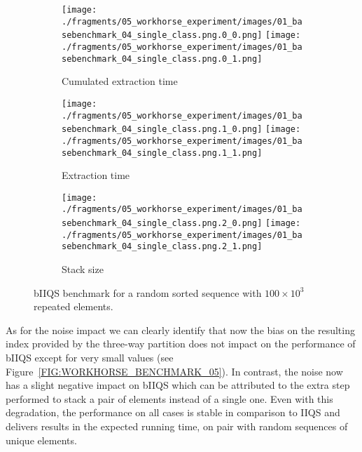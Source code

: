 \begin{figure}
    \centering
    \begin{subfigure}[b]{\textwidth}
        \centering
        \texttt{[image: ./fragments/05\_workhorse\_experiment/images/01\_basebenchmark\_04\_single\_class.png.0\_0.png]}
        \texttt{[image: ./fragments/05\_workhorse\_experiment/images/01\_basebenchmark\_04\_single\_class.png.0\_1.png]}
        \caption{Cumulated extraction time}
        \label{FIG:WORKHORSE_BENCHMARK_04__0_0}
    \end{subfigure}

    \begin{subfigure}[b]{\textwidth}
        \centering
        \texttt{[image: ./fragments/05\_workhorse\_experiment/images/01\_basebenchmark\_04\_single\_class.png.1\_0.png]}
        \texttt{[image: ./fragments/05\_workhorse\_experiment/images/01\_basebenchmark\_04\_single\_class.png.1\_1.png]}
        \caption{Extraction time}
        \label{FIG:WORKHORSE_BENCHMARK_04__0_1}
    \end{subfigure}

    \begin{subfigure}[b]{\textwidth}
        \centering
        \texttt{[image: ./fragments/05\_workhorse\_experiment/images/01\_basebenchmark\_04\_single\_class.png.2\_0.png]}
        \texttt{[image: ./fragments/05\_workhorse\_experiment/images/01\_basebenchmark\_04\_single\_class.png.2\_1.png]}
        \caption{Stack size}
        \label{FIG:WORKHORSE_BENCHMARK_04__0_2}
    \end{subfigure}
    
    \caption{bIIQS benchmark for a random sorted sequence with $100\times10^3$ repeated elements.}
    \label{FIG:WORKHORSE_BENCHMARK_04}
\end{figure}


As for the noise impact we can clearly identify that now the bias on the resulting index provided by the three-way partition does not impact on the performance of bIIQS except for very small values (see Figure~\ref{FIG:WORKHORSE_BENCHMARK_05}). In contrast, the noise now has a slight negative impact on bIIQS which can be attributed to the extra step performed to stack a pair of elements instead of a single one. Even with this degradation, the performance on all cases is stable in comparison to IIQS and delivers results in the expected running time, on pair with random sequences of unique elements.\\


